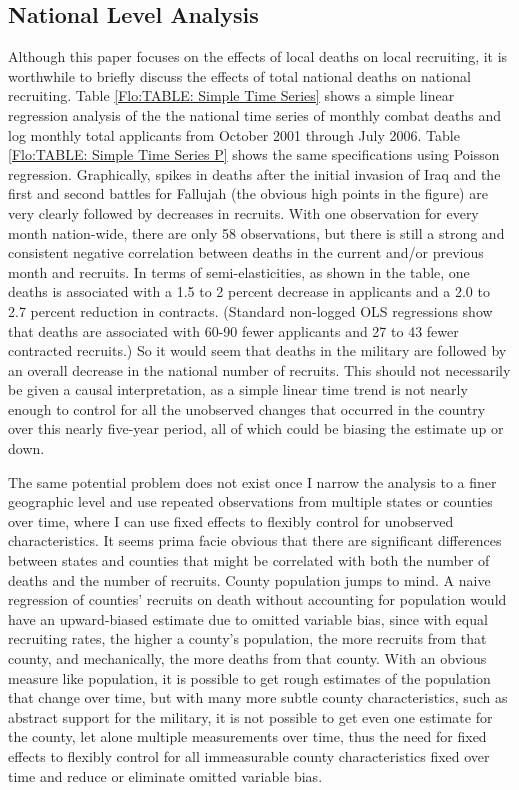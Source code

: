 \documentclass[12pt] {article}
\begin{document}
\setcounter{figure}{0}
\renewcommand{\thefigure}{A\arabic{figure}}


\subsection{National Level Analysis}
Although this paper focuses on the effects of local deaths on local
recruiting, it is worthwhile to briefly discuss the effects of total national
deaths on national recruiting. Table \ref{Flo:TABLE: Simple Time Series}
shows a simple linear regression analysis of the the national time series of monthly combat deaths and log monthly total applicants from October 2001 through July 2006. Table \ref{Flo:TABLE: Simple Time Series P} shows the same specifications using Poisson regression. Graphically, spikes in deaths after the initial invasion of Iraq and the first
and second battles for Fallujah (the obvious high points in the figure)
are very clearly followed by decreases in recruits. With one observation
for every month nation-wide, there are only 58 observations, but there
is still a strong and consistent negative correlation between deaths
in the current and/or previous month and recruits. In terms of semi-elasticities,
as shown in the table, one deaths is associated with a 1.5 to 2 percent decrease in applicants and a 2.0 to 2.7 percent reduction in contracts. (Standard non-logged OLS regressions show
that deaths are associated with 60-90 fewer applicants and 27 to 43
fewer contracted recruits.) So it would seem that deaths in the military
are followed by an overall decrease in the national number of recruits.
This should not necessarily be given a causal interpretation, as a
simple linear time trend is not nearly enough to control for all the
unobserved changes that occurred in the country over this nearly five-year
period, all of which could be biasing the estimate up or down. 

The same potential problem does not exist once I narrow the analysis
to a finer geographic level and use repeated observations from multiple
states or counties over time, where I can use fixed effects to flexibly control
for unobserved characteristics. It seems prima facie obvious that
there are significant differences between states and counties that
might be correlated with both the number of deaths and the number
of recruits. County population jumps to mind. A naive regression of
counties' recruits on death without accounting for population would
have an upward-biased estimate due to omitted variable bias, since
with equal recruiting rates, the higher a county's population, the
more recruits from that county, and mechanically, the more deaths
from that county. With an obvious measure like population, it is possible
to get rough estimates of the population that change over time, but
with many more subtle county characteristics, such as abstract support
for the military, it is not possible to get even one estimate for
the county, let alone multiple measurements over time, thus the need
for fixed effects to flexibly control for all immeasurable county
characteristics fixed over time and reduce or eliminate omitted variable bias.
\end{document}
